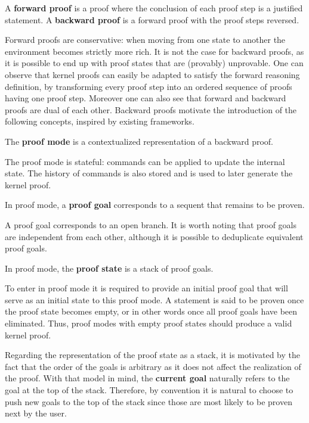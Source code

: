 \begin{definition}
A \textbf{forward proof} is a proof where the conclusion of each proof step is a justified statement.
A \textbf{backward proof} is a forward proof with the proof steps reversed.
\end{definition}

Forward proofs are conservative: when moving from one state to another the environment becomes strictly more rich. It is not the case for backward proofs, as it is possible to end up with proof states that are (provably) unprovable. One can observe that kernel proofs can easily be adapted to satisfy the forward reasoning definition, by transforming every proof step into an ordered sequence of proofs having one proof step. Moreover one can also see that forward and backward proofs are dual of each other. Backward proofs motivate the introduction of the following concepts, inspired by existing frameworks.

\begin{definition}
The \textbf{proof mode} is a contextualized representation of a backward proof.
\end{definition}

The proof mode is stateful: commands can be applied to update the internal state. The history of commands is also stored and is used to later generate the kernel proof.

\begin{definition}
In proof mode, a \textbf{proof goal} corresponds to a sequent that remains to be proven.
\end{definition}

A proof goal corresponds to an open branch. It is worth noting that proof goals are independent from each other, although it is possible to deduplicate equivalent proof goals.

\begin{definition}
In proof mode, the \textbf{proof state} is a stack of proof goals.
\end{definition}

To enter in proof mode it is required to provide an initial proof goal that will serve as an initial state to this proof mode. A statement is said to be proven once the proof state becomes empty, or in other words once all proof goals have been eliminated. Thus, proof modes with empty proof states should produce a valid kernel proof.

Regarding the representation of the proof state as a stack, it is motivated by the fact that the order of the goals is arbitrary as it does not affect the realization of the proof. With that model in mind, the \textbf{current goal} naturally refers to the goal at the top of the stack. Therefore, by convention it is natural to choose to push new goals to the top of the stack since those are most likely to be proven next by the user.

